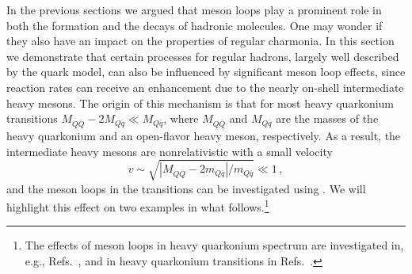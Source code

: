 In the previous sections we argued that meson loops play a prominent role in
both the formation and the decays of hadronic molecules. One may wonder if they
also have an impact on the properties of regular charmonia.
In this section we demonstrate that certain processes for regular hadrons,
largely well described by the quark model, can also be influenced by significant
meson loop effects, since reaction rates can receive an enhancement due to the
nearly on-shell intermediate heavy mesons.
The origin of this mechanism is that for most heavy quarkonium transitions
$M_{Q\bar Q}-2 M_{Q\bar q}\ll M_{Q\bar q}$, where $M_{Q\bar Q}$ and $M_{Q\bar
q}$ are the masses of the heavy quarkonium and an open-flavor heavy meson,
respectively. As a result, the intermediate heavy mesons are nonrelativistic
with a small velocity
\begin{equation}
    v\sim \sqrt{|{M_{Q\bar Q}}-2m_{Q\bar q}|/m_{Q\bar q}}\ll 1\,,
\end{equation}
and the meson loops in the transitions can be investigated 
using \nreft.
We will highlight this effect on two examples in what follows.\footnote{The
effects of meson loops in heavy quarkonium spectrum are investigated in,
e.g., Refs.~\cite{Eichten:1978tg,Eichten:1979ms,Ono:1983rd,Kalashnikova:2005ui,
Eichten:2005ga,Pennington:2007xr,Barnes:2007xu, Li:2009ad,Danilkin:2009hr,
Ortega:2010qq,Danilkin:2010cc,Liu:2011yp,Bali:2011rd,Zhou:2013ada,
Ferretti:2013faa,Ferretti:2013vua,Ferretti:2014xqa, Hammer:2016prh,Du:2016qcr,
Lu:2016mbb, Lu:2017hma,Zhou:2017dwj}, and in heavy quarkonium transitions in
Refs.~\cite{Ono:1985jt, Lipkin:1988tg,Moxhay:1988ri,Zhou:1990ik,
Li:2007xr,Meng:2007tk,Meng:2008bq,
Liu:2009dr,Zhang:2009kr,Zhang:2010zv,Wang:2011yh, Li:2011ssa,Wang:2012mf,
Guo:2012tj,Li:2013zcr,Cao:2016xqo}.}

